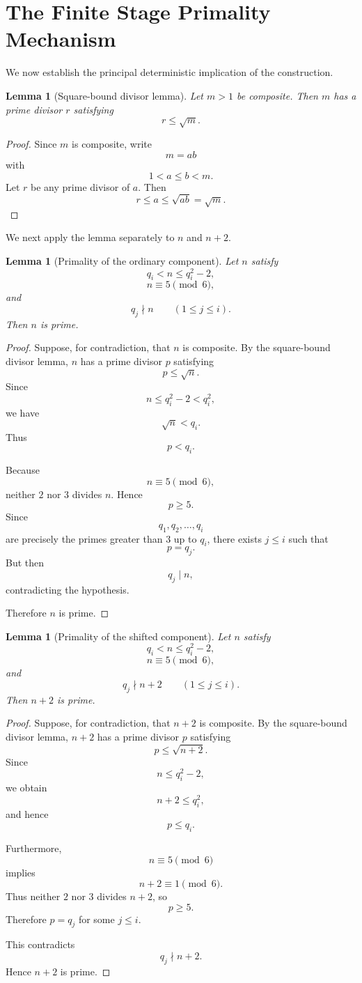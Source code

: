 \documentclass[11pt,a4paper]{article}
\newtheorem{lemma}[theorem]{Lemma}
\theoremstyle{definition}
\theoremstyle{remark}
\begin{document}
\section{The Finite Stage Primality Mechanism}

We now establish the principal deterministic implication of the
construction.

\begin{lemma}[Square-bound divisor lemma]
Let $m>1$ be composite.  Then $m$ has a prime divisor $r$ satisfying
\[
    r\le\sqrt m.
\]
\end{lemma}

\begin{proof}
Since $m$ is composite, write
\[
    m=ab
\]
with
\[
    1<a\le b<m.
\]
Let $r$ be any prime divisor of $a$.  Then
\[
    r\le a\le\sqrt{ab}=\sqrt m.
\]
\end{proof}

We next apply the lemma separately to $n$ and $n+2$.

\begin{lemma}[Primality of the ordinary component]
Let $n$ satisfy
\[
    q_i<n\le q_i^2-2,
\]
\[
    n\equiv5\pmod6,
\]
and
\[
    q_j\nmid n
    \qquad(1\le j\le i).
\]
Then $n$ is prime.
\end{lemma}

\begin{proof}
Suppose, for contradiction, that $n$ is composite.  By the
square-bound divisor lemma, $n$ has a prime divisor $p$ satisfying
\[
    p\le\sqrt n.
\]
Since
\[
    n\le q_i^2-2<q_i^2,
\]
we have
\[
    \sqrt n<q_i.
\]
Thus
\[
    p<q_i.
\]

Because
\[
    n\equiv5\pmod6,
\]
neither $2$ nor $3$ divides $n$.  Hence
\[
    p\ge5.
\]
Since
\[
    q_1,q_2,\ldots,q_i
\]
are precisely the primes greater than $3$ up to $q_i$, there exists
$j\le i$ such that
\[
    p=q_j.
\]
But then
\[
    q_j\mid n,
\]
contradicting the hypothesis.

Therefore $n$ is prime.
\end{proof}

\begin{lemma}[Primality of the shifted component]
Let $n$ satisfy
\[
    q_i<n\le q_i^2-2,
\]
\[
    n\equiv5\pmod6,
\]
and
\[
    q_j\nmid n+2
    \qquad(1\le j\le i).
\]
Then $n+2$ is prime.
\end{lemma}

\begin{proof}
Suppose, for contradiction, that $n+2$ is composite.  By the
square-bound divisor lemma, $n+2$ has a prime divisor $p$ satisfying
\[
    p\le\sqrt{n+2}.
\]
Since
\[
    n\le q_i^2-2,
\]
we obtain
\[
    n+2\le q_i^2,
\]
and hence
\[
    p\le q_i.
\]

Furthermore,
\[
    n\equiv5\pmod6
\]
implies
\[
    n+2\equiv1\pmod6.
\]
Thus neither $2$ nor $3$ divides $n+2$, so
\[
    p\ge5.
\]
Therefore $p=q_j$ for some $j\le i$.

This contradicts
\[
    q_j\nmid n+2.
\]
Hence $n+2$ is prime.
\end{proof}
\end{document}
